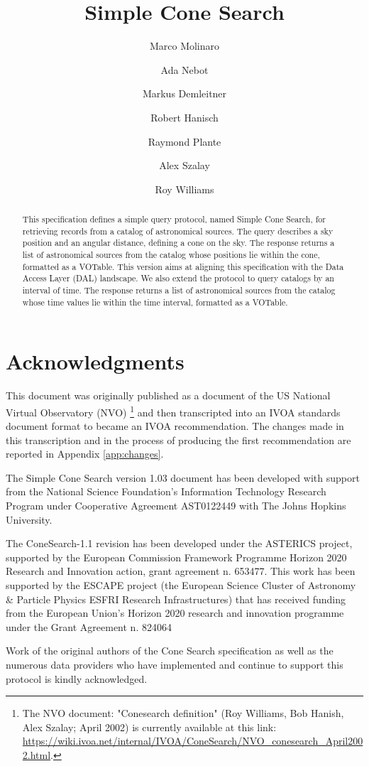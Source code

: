 \documentclass[11pt,a4paper]{ivoa}
\title{Simple Cone Search}
\author[http://www.ivoa.net/twiki/bin/view/IVOA/MarcoMolinaro]{Marco Molinaro}
\author[http://www.ivoa.net/twiki/bin/view/IVOA/AdaNebot]{Ada Nebot}
\author[http://www.ivoa.net/twiki/bin/view/IVOA/MarkusDemleitner]{Markus Demleitner}
\author[http://www.ivoa.net/twiki/bin/view/IVOA/BobHanisch]{Robert Hanisch}
\author[http://www.ivoa.net/twiki/bin/view/IVOA/RayPlante]{Raymond Plante}
\author[http://www.ivoa.net/twiki/bin/view/IVOA/AlexSzalay]{Alex Szalay}
\author[http://www.ivoa.net/twiki/bin/view/IVOA/RoyWilliams]{Roy Williams}
\begin{document}
 \begin{abstract} This specification defines a simple
query protocol, named Simple Cone Search, for retrieving records from a
catalog of astronomical sources.  The query describes a sky position and
an angular distance, defining a cone on the sky.  The response returns a
list of astronomical sources from the catalog whose positions lie within
the cone, formatted as a VOTable.  This version aims at aligning this
specification with the Data Access Layer (DAL) landscape.  We also
extend the protocol to query catalogs by an interval of time.  The
response returns a list of astronomical sources from the catalog whose
time values lie within the time interval, formatted as a
VOTable.


\end{abstract}


\section*{Acknowledgments} This document was originally published as a
document of the US National Virtual Observatory (NVO)
\footnote{
	The NVO document: "Conesearch definition" (Roy Williams, Bob Hanish, Alex Szalay; April
	2002) is currently available at this link:
	\url{https://wiki.ivoa.net/internal/IVOA/ConeSearch/NVO_conesearch_April2002.html}.
}
and then transcripted into an
IVOA standards document format to became an IVOA recommendation. The
changes made in this transcription and in the process of producing the
first recommendation are reported in Appendix \ref{app:changes}.

The Simple Cone Search version 1.03 document has been developed with
support from the National Science Foundation's Information Technology
Research Program under Cooperative Agreement AST0122449 with The Johns
Hopkins University.

The ConeSearch-1.1 revision has been developed under the ASTERICS
project, supported by the European Commission Framework Programme
Horizon 2020 Research and Innovation action, grant agreement n. 653477.
This work has been supported by the ESCAPE project (the European Science
Cluster of Astronomy \& Particle Physics ESFRI Research Infrastructures)
that has received funding from the European Union’s Horizon 2020
research and innovation programme under the Grant Agreement n. 824064

Work of the original authors of the Cone Search specification as well as
the numerous data providers who have implemented and continue to support
this protocol is kindly acknowledged.
\end{document}
